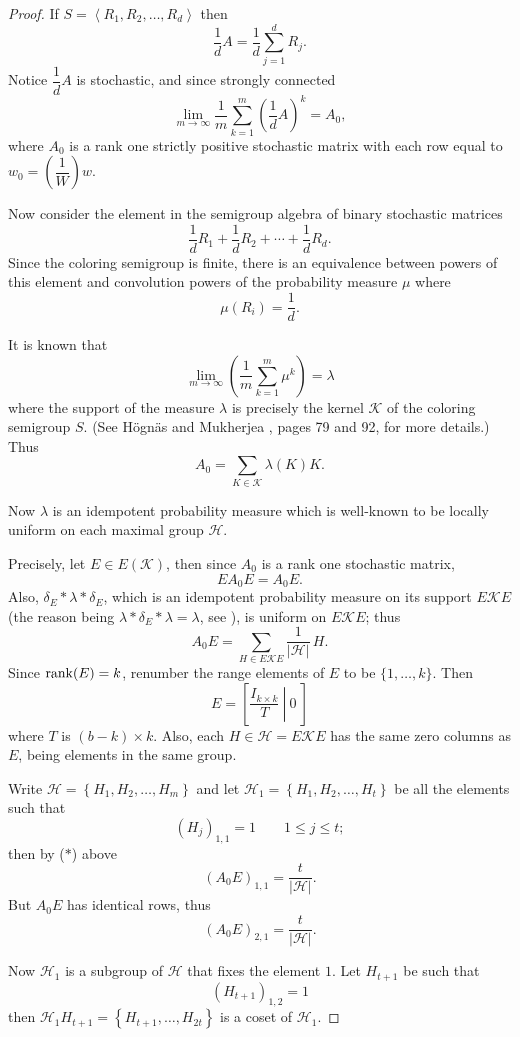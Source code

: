 \begin{proof}
If $S=\left\langle R_1,R_2,\dots,R_d\right\rangle$ then
\[
  \frac1dA=\frac1d\sum_{j=1}^dR_j.
\]
Notice $\dfrac1dA$ is stochastic, and since strongly connected 
\[
  \lim_{m\to\infty}\frac1m\sum_{k=1}^m\left( \frac1dA\right) ^k=A_0,
\]
where $A_0$ is a rank one strictly positive stochastic matrix with each row
equal to $w_0=\left( \dfrac1W\right) w$.

Now consider the element in the semigroup algebra of binary stochastic
matrices
\[
  \frac1d R_1+\frac1d R_2+\cdots+\frac1d R_d.
\]
Since the coloring semigroup is finite, there is an equivalence between
powers of this element and convolution powers of the probability measure $\mu$ where
\[
  \mu\left( R_i\right) =\frac1d.
\]

It is known that
\[
  \lim_{m\to\infty}\left( \frac1m\sum_{k=1}^m\mu^k\right) =\lambda
\]
where the support of the measure $\lambda$ is precisely the kernel $\mathcal{K}$ of the coloring semigroup $S$. 
(See H\"ogn\"as and Mukherjea \cite{HM}, pages 79 and 92, for more details.) 
Thus
\[
  A_0=\sum_{K\in \mathcal{K}}\lambda(K) K.
\]

Now $\lambda$ is an idempotent probability measure which is well-known to be
locally uniform on each maximal group $\mathcal{H}$.

Precisely, let $E\in E(\mathcal{K})$, then since $A_0$ is a rank one stochastic matrix,
\[
  EA_0E=A_0E.
\]
Also, $\delta_E\ast\lambda\ast\delta_E$, which is an idempotent probability
measure on its support $E\mathcal{K}E$ (the reason being $\lambda\ast\delta_E\ast\lambda=\lambda$, see \cite{HM}), is uniform on $E\mathcal{K}E$; 
thus
\[
  A_0E=\sum_{H\in E\mathcal{K}E}\frac 1{|\mathcal{H}|}\,H. \tag{$\ast$}
\]
Since $\operatorname{rank}(E)=k$, renumber the range elements of $E$ to be $\{1,\dots,k\}$. 
Then
\[
  E=\left[ \left.\dfrac{I_{k\times k}}T\ \right|\ 0\ \right] 
\]
where $T$ is $(b-k)\times k$. 
Also, each $H\in \mathcal{H} = E\mathcal{K}E$ has the same zero columns as $E$, being elements in the same group.

Write $\mathcal{H} = \left\{H_1,H_2,\dots,H_m\right\}$ and let $\mathcal{H}_1=\left\{H_1,H_2,\dots,H_t\right\}$ be all the elements such that
\[
  \left( H_j\right) _{1,1}=1\qquad 1\le j\le t;
\]
then by ($\ast$) above
\[
  \left( A_0E\right) _{1,1}=\frac t{|\mathcal{H}|}.
\]
But $A_0E$ has identical rows, thus
\[
  \left( A_0E\right) _{2,1}=\frac t{|\mathcal{H}|}.
\]

Now $\mathcal{H}_1$ is a subgroup of $\mathcal{H}$ that fixes the element $1$. 
Let $H_{t+1}$ be such that
\[
  \left( H_{t+1}\right) _{1,2}=1
\]
then $\mathcal{H}_1 H_{t+1}=\left\{H_{t+1},\dots,H_{2t}\right\}$ is a coset of $\mathcal{H}_1$.


\end{proof}
